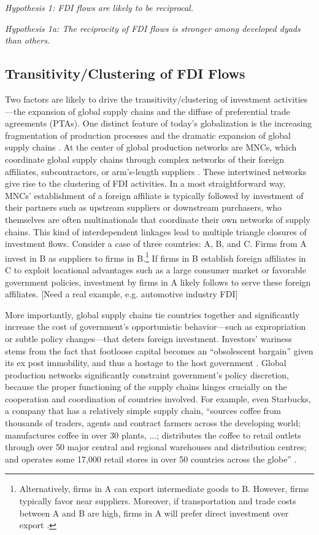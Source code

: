 \documentclass{article}
\begin{document}
\textit{Hypothesis 1: FDI flows are likely to be reciprocal.}

\textit{Hypothesis 1a: The reciprocity of FDI flows is stronger among developed dyads than others.}

\subsection{Transitivity/Clustering of FDI Flows}
Two factors are likely to drive the transitivity/clustering of investment activities---the expansion of global supply chains and the diffuse of preferential trade agreements (PTAs).  One distinct feature of today's globalization is the increasing fragmentation of production processes and the dramatic expansion of global supply chains \citep{UNCTAD:2013}. At the center of global production networks are MNCs, which coordinate global supply chains through complex networks of their foreign affiliates, subcontractors, or arm's-length suppliers \citep[xxii]{UNCTAD:2013}. These intertwined networks give rise to the clustering of FDI activities. In a most straightforward way, MNCs' establishment of a foreign affiliate is typically followed by investment of their partners such as upstream suppliers or downstream purchasers, who themselves are often multinationals that coordinate their own networks of supply chains. This kind of interdependent linkages lead to multiple triangle closures of investment flows. Consider a case of three countries: A, B, and C. Firms from A invest in B as suppliers to firms in B.\footnote{Alternatively, firms in A can export intermediate goods to B. However, firms typically favor near suppliers. Moreover, if transportation and trade costs between A and B are high, firms in A will prefer direct investment over export \citep{Carr_et_al:2001}. } If firms in B establish foreign affiliates in C to exploit locational advantages such as a large consumer market or favorable government policies, investment by firms in A likely follows to serve these foreign affiliates. [Need a real example, e.g. automotive industry FDI]

More importantly, global supply chains tie countries together and significantly increase the cost of government's opportunistic behavior---such as expropriation or subtle policy changes---that deters foreign investment. Investors' wariness stems from the fact that footloose capital becomes an ``obsolescent bargain'' given its ex post immobility, and thus a hostage to the host government \citep{Vernon:1971,Vernon:1980}. Global production networks significantly constraint government's policy discretion, because the proper functioning of the supply chains hinges crucially on the cooperation and coordination of countries involved. For example, even Starbucks, a company that has a relatively simple supply chain, ``sources coffee from thousands of traders, agents and contract farmers across the developing world; manufactures coffee in over 30 plants, ...; distributes the coffee to retail outlets through over 50 major central and regional warehouses and distribution centres; and operates some 17,000 retail stores in over 50 countries across the globe'' \citep[142]{UNCTAD:2013}.
\end{document}
